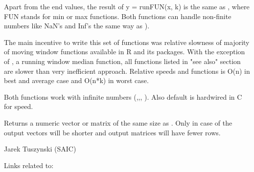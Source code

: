 \begin{Details}\relax
Apart from the end values, the result of y = runFUN(x, k) is the same as 
, where FUN 
stands for min or max functions.  Both functions can handle non-finite 
numbers like NaN's and Inf's the same way as ).


The main incentive to write this set of functions was relative slowness of 
majority of moving window functions available in R and its packages.  With the 
exception of , a running window median function, all 
functions listed in "see also" section are slower than very inefficient 
 approach. Relative 
speeds  and  functions is O(n) in best and average 
case and O(n*k) in worst case.

Both functions work with infinite numbers (,,,
). Also default  is hardwired in C for speed.
\end{Details}
\begin{Value}
Returns a numeric vector or matrix of the same size as . Only in case of 
 the output vectors will be shorter and output matrices 
will have fewer rows.
\end{Value}
\begin{Author}\relax
Jarek Tuszynski (SAIC) 
\end{Author}
\begin{SeeAlso}\relax
Links related to:
\end{SeeAlso}
